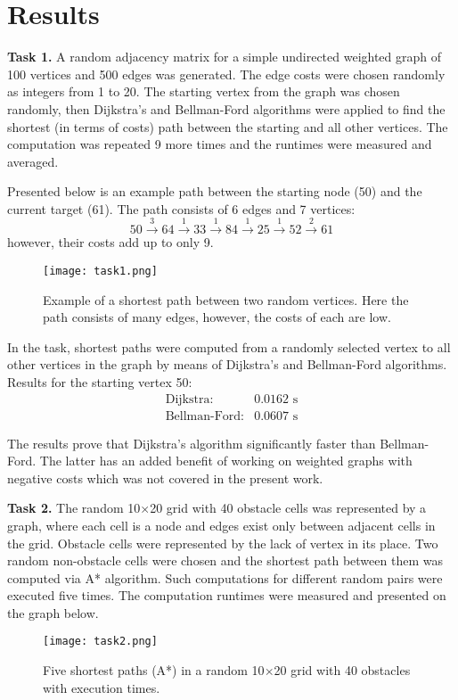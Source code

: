 \documentclass[12pt, a4paper]{article}
\begin{document}
\newpage

\section*{Results}

\textbf{Task 1.} A random adjacency matrix for a simple undirected weighted graph of 100 vertices and 500 edges was generated. The edge costs were chosen randomly as integers from 1 to 20. The starting vertex from the graph was chosen randomly, then Dijkstra's and Bellman-Ford algorithms were applied to find the shortest (in terms of costs) path between the starting and all other vertices. The computation was repeated 9 more times and the runtimes were measured and averaged.

Presented below is an example path between the starting node (50) and the current target (61). The path consists of 6 edges and 7 vertices:
\[ 50 \xrightarrow{3} 64 \xrightarrow{1} 33 \xrightarrow{1} 84 \xrightarrow{1} 25 \xrightarrow{1} 52 \xrightarrow{2} 61 \]
however, their costs add up to only 9.
\begin{figure}[!h]
	\centering
	\texttt{[image: task1.png]}
	\caption{Example of a shortest path between two random vertices. Here the path consists of many edges, however, the costs of each are low.}
\end{figure}

In the task, shortest paths were computed from a randomly selected vertex to all other vertices in the graph by means of Dijkstra's and Bellman-Ford algorithms. Results for the starting vertex 50:
\[ \begin{matrix} \text{Dijkstra:} & 0.0162 \text{ s} \\
\text{Bellman-Ford:} & 0.0607 \text{ s} \end{matrix} \] 

The results prove that Dijkstra's algorithm significantly faster than Bellman-Ford. The latter has an added benefit of working on weighted graphs with negative costs which was not covered in the present work.

\newpage

\textbf{Task 2.} The random 10$\times$20 grid with 40 obstacle cells was represented by a graph, where each cell is a node and edges exist only between adjacent cells in the grid. Obstacle cells were represented by the lack of vertex in its place. Two random non-obstacle cells were chosen and the shortest path between them was computed via A* algorithm. Such computations for different random pairs were executed five times. The computation runtimes were measured and presented on the graph below.
\begin{figure}[!h]
	\centering
	\texttt{[image: task2.png]}
	\caption{Five shortest paths (A*) in a random 10$\times$20 grid with 40 obstacles with execution times.}
\end{figure}
\end{document}
